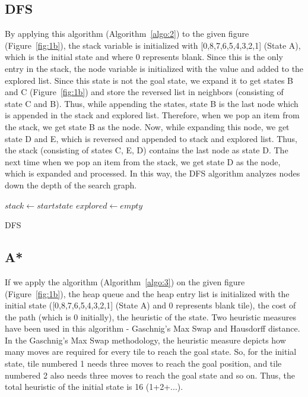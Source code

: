 \documentclass{svproc}
\begin{document}
\subsection{DFS}
\setlength{\intextsep}{2pt}
\noindent By applying this algorithm (Algorithm~\ref{algo:2}) to the given figure (Figure~\ref{fig:1b}), the stack variable is initialized with [0,8,7,6,5,4,3,2,1] (State A), which is the initial state and where 0 represents blank. Since this is the only entry in the stack, the node variable is initialized with the value and added to the explored list. Since this state is not the goal state, we expand it to get states B and C (Figure~\ref{fig:1b}) and store the reversed list in neighbors (consisting of state C and B). Thus, while appending the states, state B is the last node which is appended in the stack and explored list. Therefore, when we pop an item from the stack, we get state B as the node. Now, while expanding this node, we get state D and E, which is reversed and appended to stack and explored list. Thus, the stack (consisting of states C, E, D) contains the last node as state D. The next time when we pop an item from the stack, we get state D as the node, which is expanded and processed. In this way, the DFS algorithm analyzes nodes down the depth of the search graph. 
\begin{algorithm}
	\SetAlgoLined
	$stack \gets start state$\;
	$explored \gets empty$\;
	\caption{DFS}
	\label{algo:2}
\end{algorithm}

\subsection{A*}
If we apply the algorithm (Algorithm~\ref{algo:3})  on the given figure (Figure~\ref{fig:1b}), the heap queue and the heap entry list is initialized with the initial state ([0,8,7,6,5,4,3,2,1] (State A) and 0 represents blank tile), the cost of the path (which is 0 initially), the heuristic of the state. Two heuristic measures have been used in this algorithm - Gaschnig’s Max Swap and Hausdorff distance. In the Gaschnig’s Max Swap methodology, the heuristic measure depicts how many moves are required for every tile to reach the goal state. So, for the initial state, tile numbered 1 needs three moves to reach the goal position, and tile numbered 2 also needs three moves to reach the goal state and so on. Thus, the total heuristic of the initial state is 16 (1+2+...).
\end{document}
